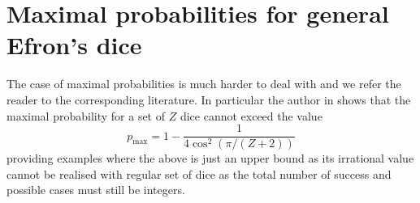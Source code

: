 \section{Maximal probabilities for general Efron's dice}
The case of maximal probabilities is much harder to deal with and
we refer the reader to the corresponding literature. In particular
the author in \cite{bogdanov} shows that the maximal probability
for a set of $Z$ dice cannot exceed the value
\begin{equation*}
	p_{\textrm{max}} = 1-\frac{1}{4\cos^2(\pi/(Z+2))}
\end{equation*}
providing examples where the above is just an upper bound as
its irrational value cannot be realised with regular set of dice
as the total number of success and possible cases must still
be integers.